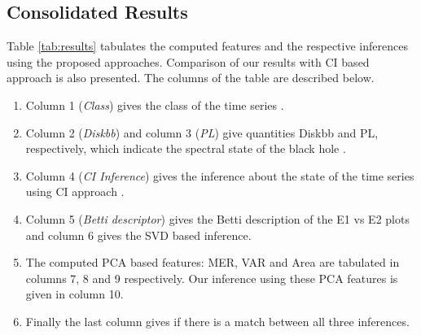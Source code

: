 \documentclass[10pt,conference]{IEEEtran}
\begin{document}
\subsection{Consolidated Results}

Table \ref{tab:results}  tabulates the computed features and the respective inferences using the proposed approaches. Comparison of our results with CI based approach \cite{Adegoke2018} is also presented. The columns of the table are described below.

\begin{enumerate}
 \item Column 1 (\textit{Class}) gives the class of the time series \cite{Adegoke2018}.
 \item Column 2 (\textit{Diskbb}) and column 3 (\textit{PL}) give quantities Diskbb and  PL, respectively, which indicate the spectral state of the black hole \cite{Adegoke2018}.
 \item Column 4 (\textit{CI Inference}) gives the inference about the state of the time series using CI approach \cite{Adegoke2018}.
 \item Column 5 (\textit{Betti descriptor}) gives the Betti description of the E1 vs E2 plots and column 6 gives the SVD based inference.
 \item The computed PCA based features: MER, VAR and Area  are tabulated in columns 7, 8 and 9 respectively. Our inference using these PCA features is given in column 10.
 \item Finally the last column gives if there is a match between all three inferences.
\end{enumerate}
\end{document}
